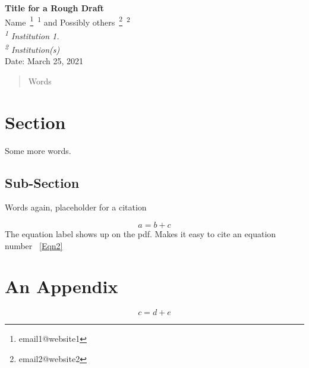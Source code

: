 %


\SetWatermarkFontSize{15 pt}
\SetWatermarkHorCenter{500 pt}
\SetWatermarkVerCenter{25 pt}



\begin{center}
{\bf Title for a Rough Draft} \bsk\\
    Name~\footnote{email1@website1}~\textsuperscript{1} 
    and Possibly others~\footnote{email2@website2}~\textsuperscript{2}\\
{\em \textsuperscript{1} Institution 1.}\\
{\em \textsuperscript{2} Institution(s)}\\
Date: March 25, 2021
\end{center}

\begin{abstract}
Words
\end{abstract}

\section{Section}
\label{Label1}
\xb
{}
\xa

Some more words. 

\subsection{Sub-Section}
\label{Label2}
\xb
{}
\xa

Words again, placeholder for a citation~\cites{PaperX}

\begin{equation}
    a = b + c
    \label{anEqn}
\end{equation}
%
The equation label shows up on the pdf. Makes it easy to cite an equation number
~\eqref{Eqn2}


\appendix
\section{An Appendix}

\begin{equation}
    c = d + e
    \label{Eqn2}
\end{equation}
%

